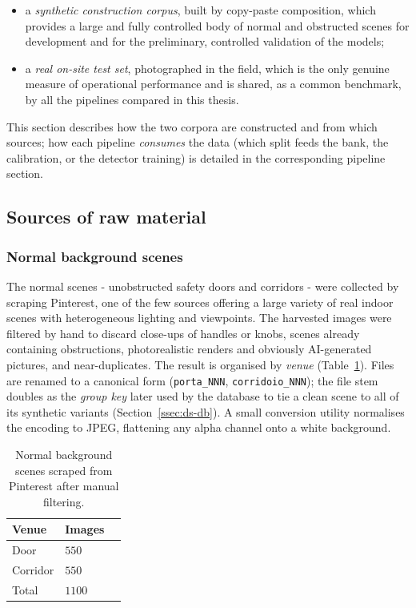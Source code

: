 \begin{itemize}
  \item a \emph{synthetic construction corpus}, built by copy-paste composition,
  which provides a large and fully controlled body of normal and obstructed
  scenes for development and for the preliminary, controlled validation of the
  models;
  \item a \emph{real on-site test set}, photographed in the field, which is the
  only genuine measure of operational performance and is shared, as a common
  benchmark, by all the pipelines compared in this thesis.
\end{itemize}

This section describes how the two corpora are constructed and from which sources;
how each pipeline \emph{consumes} the data (which split feeds the bank, the
calibration, or the detector training) is detailed in the corresponding pipeline
section.

\subsection{Sources of raw material}

\subsubsection{Normal background scenes}

The normal scenes - unobstructed safety doors and corridors - were collected by
scraping Pinterest, one of the few sources offering a large variety of real
indoor scenes with heterogeneous lighting and viewpoints. The harvested images
were filtered by hand to discard close-ups of handles or knobs, scenes already
containing obstructions, photorealistic renders and obviously AI-generated
pictures, and near-duplicates. The result is organised by \emph{venue}
(Table~\ref{tab:ds-normals}). Files are renamed to a canonical form
(\texttt{porta\_NNN}, \texttt{corridoio\_NNN}); the file stem doubles as the
\emph{group key} later used by the database to tie a clean scene to all of its
synthetic variants (Section~\ref{ssec:ds-db}). A small conversion utility
normalises the encoding to JPEG, flattening any alpha channel onto a white
background.

\begin{table}[h]
  \centering
  \begin{tabular}{llc}
    \hline
    Venue & Images \\
    \hline
    Door & $550$ \\
    Corridor & $550$ \\
    \hline
    Total & $1100$ \\
    \hline
  \end{tabular}
  \caption{Normal background scenes scraped from Pinterest after manual
  filtering.}
  \label{tab:ds-normals}
\end{table}


